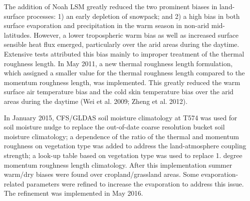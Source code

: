 The addition of Noah L\+SM greatly reduced the two prominent biases in land-\/surface processes\+: 1) an early depletion of snowpack; and 2) a high bias in both surface evaporation and precipitation in the warm season in non-\/arid mid-\/latitudes. However, a lower tropospheric warm bias as well as increased surface sensible heat flux emerged, particularly over the arid areas during the daytime. Extensive tests attributed this bias mainly to improper treatment of the thermal roughness length. In May 2011, a new thermal roughness length formulation, which assigned a smaller value for the thermal roughness length compared to the momentum roughness length, was implemented. This greatly reduced the warm surface air temperature bias and the cold skin temperature bias over the arid areas during the daytime (Wei et al. 2009; Zheng et al. 2012).

In January 2015, C\+F\+S/\+G\+L\+D\+AS soil moisture climatology at T574 was used for soil moisture nudge to replace the out-\/of-\/date coarse resolution bucket soil moisture climatology; a dependence of the ratio of the thermal and momentum roughness on vegetation type was added to address the land-\/atmosphere coupling strength; a look-\/up table based on vegetation type was used to replace 1. degree momentum roughness length climatology. After this implementation summer warm/dry biases were found over cropland/grassland areas. Some evaporation-\/related parameters were refined to increase the evaporation to address this issue. The refinement was implemented in May 2016.

